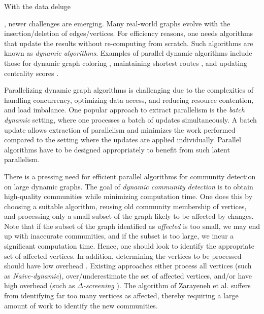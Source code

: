 With the data deluge, newer challenges are emerging. Many real-world graphs evolve with the insertion/deletion of edges/vertices. For efficiency reasons, one needs algorithms that update the results without re-computing from scratch. Such algorithms are known as \textit{dynamic algorithms}. Examples of parallel dynamic algorithms include those for dynamic graph coloring \cite{color-yuan17, color-bhattacharya18}, maintaining shortest routes \cite{path-zhang17, path-khanda21}, and updating centrality scores \cite{cent-shao20, cent-regunta21}.

Parallelizing dynamic graph algorithms is challenging due to the complexities of handling concurrency, optimizing data access, and reducing resource contention, and load imbalance. One popular approach to extract parallelism is the \textit{batch dynamic} setting, where one processes a batch of updates simultaneously. A batch update allows extraction of parallelism and minimizes the work performed compared to the setting where the updates are applied individually. Parallel algorithms have to be designed appropriately to benefit from such latent parallelism.

There is a pressing need for efficient parallel algorithms for community detection on large dynamic graphs. The goal of \textit{dynamic community detection} is to obtain high-quality communities while minimizing computation time. One does this by choosing a suitable algorithm, reusing old community membership of vertices, and processing only a small subset of the graph likely to be affected by changes. Note that if the subset of the graph identified as \textit{affected} is too small, we may end up with inaccurate communities, and if the subset is too large, we incur a significant computation time. Hence, one should look to identify the appropriate set of affected vertices. In addition, determining the vertices to be processed should have low overhead \cite{incr-ramalingam96}. Existing approaches either process all vertices (such as \textit{Naive-dynamic}), over/underestimate the set of affected vertices, and/or have high overhead (such as \textit{$\Delta$-screening} \cite{com-zarayeneh21}). The algorithm of Zarayeneh et al. \cite{com-zarayeneh21} suffers from identifying far too many vertices as affected, thereby requiring a large amount of work to identify the new communities.

